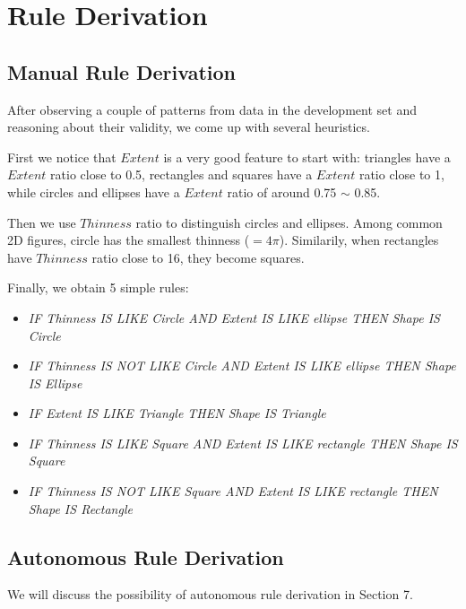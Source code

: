 \section{Rule Derivation}

\subsection{Manual Rule Derivation}

After observing a couple of patterns from data in the development set and reasoning about their validity, we come up with several heuristics.

First we notice that $Extent$ is a very good feature to start with: triangles have a $Extent$ ratio close to 0.5, rectangles and squares have a $Extent$ ratio close to 1, while circles and ellipses have a $Extent$ ratio of around 0.75 $\sim$ 0.85.

Then we use $Thinness$ ratio to distinguish circles and ellipses. Among common 2D figures, circle has the smallest thinness ($=4\pi$). Similarily, when rectangles have $Thinness$ ratio close to 16, they become squares.

Finally, we obtain 5 simple rules:

\begin{itemize}

\item \textit{IF Thinness IS LIKE Circle AND Extent IS LIKE ellipse THEN Shape IS Circle}
\item \textit{IF Thinness IS NOT LIKE Circle AND Extent IS LIKE ellipse THEN Shape IS Ellipse}
\item \textit{IF Extent IS LIKE Triangle THEN Shape IS Triangle}
\item \textit{IF Thinness IS LIKE Square AND Extent IS LIKE rectangle THEN Shape IS Square}
\item \textit{IF Thinness IS NOT LIKE Square AND Extent IS LIKE rectangle THEN Shape IS Rectangle}

\end{itemize}

\subsection{Autonomous Rule Derivation}

We will discuss the possibility of autonomous rule derivation in Section 7.
